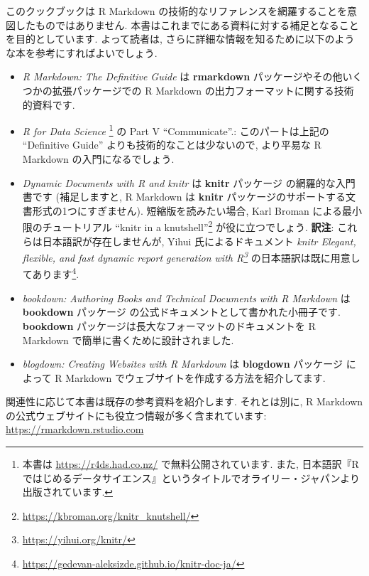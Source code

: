 \documentclass[
  11pt,
  lualatex,
  ja=standard]{bxjsreport}
\renewcommand{\href}[2]{#2\footnote{\url{#1}}}
\begin{document}
このクックブックは R Markdown の技術的なリファレンスを網羅することを意図したものではありません. 本書はこれまでにある資料に対する補足となることを目的としています. よって読者は, さらに詳細な情報を知るために以下のような本を参考にすればよいでしょう.

\begin{itemize}
\item
  \emph{R Markdown: The Definitive Guide} \autocite{rmarkdown2018} は \textbf{rmarkdown} パッケージやその他いくつかの拡張パッケージでの R Markdown の出力フォーマットに関する技術的資料です.
\item
  \emph{R for Data Science} \autocite{wickham2016Data}\footnote{本書は \url{https://r4ds.had.co.nz/} で無料公開されています. また, 日本語訳『Rではじめるデータサイエンス』というタイトルでオライリー・ジャパンより出版されています.} の Part V ``Communicate''.: このパートは上記の ``Definitive Guide'' よりも技術的なことは少ないので, より平易な R Markdown の入門になるでしょう.
\item
  \emph{Dynamic Documents with R and knitr} \autocite{knitr2015} は \textbf{knitr} パッケージ \autocite{R-knitr} の網羅的な入門書です (補足しますと, R Markdown は \textbf{knitr} パッケージのサポートする文書形式の1つにすぎません). 短縮版を読みたい場合, Karl Broman による最小限のチュートリアル \href{https://kbroman.org/knitr_knutshell/}{``knitr in a knutshell''} が役に立つでしょう. \textbf{訳注}: これらは日本語訳が存在しませんが, Yihui 氏によるドキュメント \emph{\href{https://yihui.org/knitr/}{knitr Elegant, flexible, and fast dynamic report generation with R}} の日本語訳は既に用意してあります\footnote{\url{https://gedevan-aleksizde.github.io/knitr-doc-ja/}}.
\item
  \emph{bookdown: Authoring Books and Technical Documents with R Markdown} \autocite{bookdown2016} は \textbf{bookdown} パッケージ \autocite{R-bookdown} の公式ドキュメントとして書かれた小冊子です. \textbf{bookdown} パッケージは長大なフォーマットのドキュメントを R Markdown で簡単に書くために設計されました.
\item
  \emph{blogdown: Creating Websites with R Markdown} \autocite{blogdown2017} は \textbf{blogdown} パッケージ \autocite{R-blogdown} によって R Markdown でウェブサイトを作成する方法を紹介してます.
\end{itemize}

関連性に応じて本書は既存の参考資料を紹介します. それとは別に, R Markdown の公式ウェブサイトにも役立つ情報が多く含まれています: \url{https://rmarkdown.rstudio.com}
\end{document}

